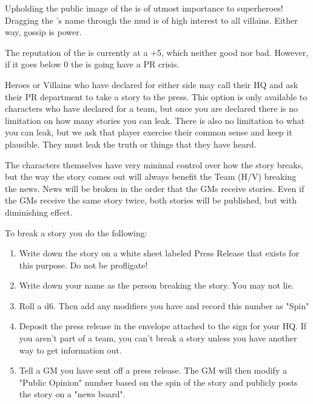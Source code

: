 \documentclass[green]{LRSguildcamp1}
\begin{document}
\name{\gPR{}}

Upholding the public image of the \cHeroLeague{\intro} is of utmost importance to superheroes! 
Dragging the \cHeroLeague{}'s name through the mud is of high interest to all villains. Either way, gossip is power. 

The reputation of the \cHeroLeague{\intro} is currently at a +5, which neither good nor bad. However, if it goes below 0 the \cHeroLeague{} is going have a PR crisis. 

Heroes or Villains who have declared for either side may call their HQ and ask their PR department to take a story to the press. This option is only available to characters who have declared for a team, but once you are declared there is no limitation on how many stories you can leak. There is also no limitation to what you can leak, but we ask that player exercise their common sense and keep it plausible. They must leak the truth or things that they have heard. 

The characters themselves have very minimal control over how the story breaks, but the way the story comes out will always benefit the Team (H/V) breaking the news. News will be broken in the order that the GMs receive stories. Even if the GMs receive the same story twice, both stories will be published, but with diminishing effect. 

To break a story you do the following:
\begin{enumerate}
\item Write down the story on a white sheet labeled Press Release that exists for this purpose. Do not be profligate! 
\item Write down your name as the person breaking the story. You may not lie. 
\item Roll a d6. Then add any modifiers you have and record this number as "Spin"
\item Deposit the press release in the envelope attached to the sign for your HQ. If you aren't part of a team, you can't break a story unless you have another way to get information out. 
\item Tell a GM you have sent off a press release.
The GM will then modify a "Public Opinion" number based on the spin of the story and publicly posts the story on a "news board".
\end{enumerate}
\end{document}
